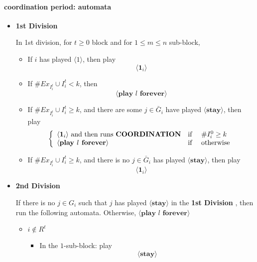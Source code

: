 \documentclass[12pt,letter]{article}
\theoremstyle{definition}
\theoremstyle{remark}
\theoremstyle{claim}
\begin{document}
\paragraph{coordination period: automata}


\begin{itemize}





\item \textbf{1st Division} 


In 1st division, for $t\geq 0$ block and for $1\leq m \leq n$ sub-block,
\begin{itemize}

\item If $i$ has played $\langle 1 \rangle$, then play
\[\langle \mathbf{1}_i \rangle\]

\item If $\# Ex_{I^{t}_i}\cup I^{t}_i<k$, then \[\langle\textbf{play $l$ forever}\rangle\]

\item If $\# Ex_{I^{t}_i}\cup I^{t}_i\geq k$, and there are some $j\in \bar{G}_i$ have played $\langle \textbf{stay} \rangle $, then play
\[\left\{
\begin{array}{l r l}      
    \langle \mathbf{1}_i \rangle \text{ and then runs \textbf{COORDINATION}} 	& \text{if } &\# I^{0}_i\geq k \\
    \langle\textbf{play $l$ forever}\rangle														&\text{if } 		& \text{otherwise}
\end{array}\right.
\]
\item If $\# Ex_{I^{t}_i}\cup I^{t}_i \geq k$, and there is no $j\in \bar{G}_i$ has played $\langle \textbf{stay} \rangle $, then play
\[\langle \mathbf{1}_i \rangle\]

\end{itemize}




\item \textbf{2nd Division} 

If there is no $j\in G_i$ such that $j$ has played $\langle \textbf{stay} \rangle$ in the \textbf{1st Division} , then run the following automata. Otherwise, $\langle\textbf{play $l$ forever}\rangle		$ 

\begin{itemize}
\item $i\notin R^t $
\begin{itemize}
\item In the $1$-sub-block: play
\[\langle \textbf{stay} \rangle \]



\end{itemize}
\end{itemize}
\end{itemize}
\end{document}

